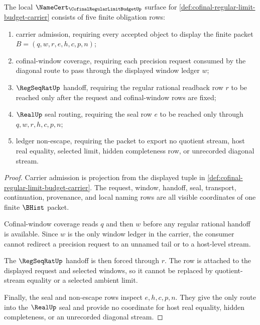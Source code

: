 \begin{theorem}
\label{thm:cofinal-regular-limit-budget-namecert-obligations}
The local $\NameCert_{\CofinalRegularLimitBudgetUp}$ surface for \autoref{def:cofinal-regular-limit-budget-carrier} consists of five finite obligation rows:
\begin{enumerate}
\item carrier admission, requiring every accepted object to display the finite packet $B=(q,w,r,e,h,c,p,n)$;
\item cofinal-window coverage, requiring each precision request consumed by the diagonal route to pass through the displayed window ledger $w$;
\item $\RegSeqRatUp$ handoff, requiring the regular rational readback row $r$ to be reached only after the request and cofinal-window rows are fixed;
\item $\RealUp$ seal routing, requiring the seal row $e$ to be reached only through $q,w,r,h,c,p,n$;
\item ledger non-escape, requiring the packet to export no quotient stream, host real equality, selected limit, hidden completeness row, or unrecorded diagonal stream.
\end{enumerate}
\end{theorem}
\begin{proof}
Carrier admission is projection from the displayed tuple in \autoref{def:cofinal-regular-limit-budget-carrier}. The request, window, handoff, seal, transport, continuation, provenance, and local naming rows are all visible coordinates of one finite $\BHist$ packet.

Cofinal-window coverage reads $q$ and then $w$ before any regular rational handoff is available. Since $w$ is the only window ledger in the carrier, the consumer cannot redirect a precision request to an unnamed tail or to a host-level stream.

The $\RegSeqRatUp$ handoff is then forced through $r$. The row is attached to the displayed request and selected windows, so it cannot be replaced by quotient-stream equality or a selected ambient limit.

Finally, the seal and non-escape rows inspect $e,h,c,p,n$. They give the only route into the $\RealUp$ seal and provide no coordinate for host real equality, hidden completeness, or an unrecorded diagonal stream.
\end{proof}

